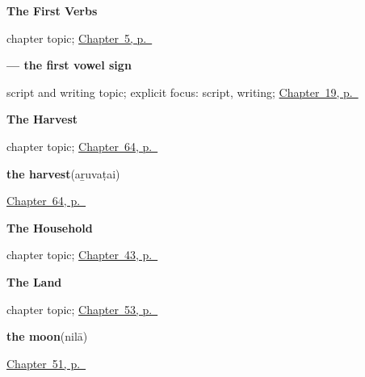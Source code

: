 \noindent\begin{minipage}[t]{\linewidth}
\raggedright
\textbf{The First Verbs}\par
\footnotesize chapter topic; \hyperref[ch:first-verbs]{Chapter~5, p.~\pageref*{ch:first-verbs}}
\end{minipage}\par\smallskip

\noindent\begin{minipage}[t]{\linewidth}
\raggedright
\textbf{ — the first vowel sign}\par
\footnotesize script and writing topic; explicit focus: script, writing; \hyperref[ch:ta-asking-age]{Chapter~19, p.~\pageref*{ch:ta-asking-age}}
\end{minipage}\par\smallskip

\noindent\begin{minipage}[t]{\linewidth}
\raggedright
\textbf{The Harvest}\par
\footnotesize chapter topic; \hyperref[ch:ta-the-harvest]{Chapter~64, p.~\pageref*{ch:ta-the-harvest}}
\end{minipage}\par\smallskip

\noindent\begin{minipage}[t]{\linewidth}
\raggedright
\textbf{the harvest}\enspace\emph{}\enspace(aṟuvaṭai)\par
\footnotesize \hyperref[ch:ta-the-harvest]{Chapter~64, p.~\pageref*{ch:ta-the-harvest}}
\end{minipage}\par\smallskip

\noindent\begin{minipage}[t]{\linewidth}
\raggedright
\textbf{The Household}\par
\footnotesize chapter topic; \hyperref[ch:ta-household]{Chapter~43, p.~\pageref*{ch:ta-household}}
\end{minipage}\par\smallskip

\noindent\begin{minipage}[t]{\linewidth}
\raggedright
\textbf{The Land}\par
\footnotesize chapter topic; \hyperref[ch:ta-the-land]{Chapter~53, p.~\pageref*{ch:ta-the-land}}
\end{minipage}\par\smallskip

\noindent\begin{minipage}[t]{\linewidth}
\raggedright
\textbf{the moon}\enspace\emph{}\enspace(nilā)\par
\footnotesize \hyperref[ch:ta-overhead]{Chapter~51, p.~\pageref*{ch:ta-overhead}}
\end{minipage}\par\smallskip

